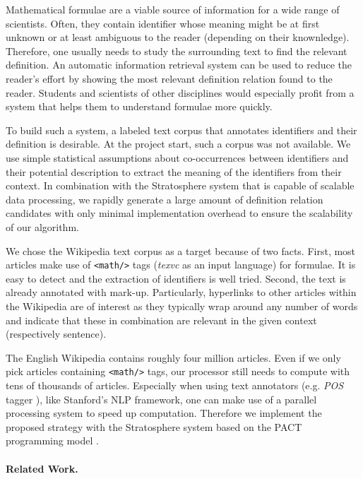 \documentclass[runningheads]{llncs}
\begin{document}
Mathematical formulae are a viable source of information for a wide range of
scientists. Often, they contain identifier whose meaning might be at first
unknown or at least ambiguous to the reader (depending on their knownledge).
Therefore, one usually needs to study the surrounding text to find the
relevant definition. An automatic information retrieval system can be used to
reduce the reader's effort by showing the most relevant definition relation
found to the reader. Students and scientists of other disciplines would
especially profit from a system that helps them to understand formulae more
quickly.


To build such a system, a labeled text corpus that annotates identifiers and
their definition is desirable. At the project start, such a corpus was not
available. We use simple statistical assumptions about co-occurrences between
identifiers and their potential description to extract the meaning of the
identifiers from their context. In combination with the Stratosphere system
that is capable of scalable data processing,  we rapidly generate a large
amount of definition relation candidates with only minimal implementation
overhead to ensure the scalability of our algorithm.


We chose the Wikipedia text corpus as a target because of two facts. First,
most articles make use of \texttt{<math/>} tags (\emph{texvc} as an input
language) for formulae. It is easy to detect and the extraction of identifiers
is well tried. Second, the text is already annotated with mark-up.
Particularly, hyperlinks to other articles within the Wikipedia are of
interest as they typically wrap around any number of words and indicate that
these in combination are relevant in the given context (respectively
sentence).


The English Wikipedia contains roughly four million articles. Even if we only
pick articles containing \texttt{<math/>} tags, our processor still needs to
compute with tens of thousands of articles. Especially when using text
annotators (e.g. \emph{POS} tagger \cite{Rathna96}), like Stanford's NLP
framework, one can make use of a parallel processing system to speed up
computation. Therefore we implement the proposed strategy with the
Stratosphere system based on the PACT programming model \cite{Alexandrov2010}.


\paragraph{Related Work.}
\end{document}
